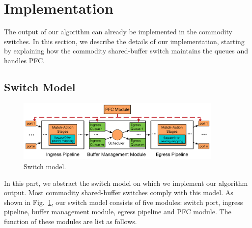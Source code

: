 \section{Implementation}\label{sec:implementation}

The output of our algorithm can already be implemented in the commodity switches. In this section, we
describe the details of our implementation, starting by explaining how the commodity shared-buffer switch
maintains the queues and handles PFC.   

\subsection{Switch Model}\label{subsec:model}

\begin{figure}
	\centering
		\includegraphics[width=0.9\textwidth] {figs/switch_model}
	\caption{Switch model.}\label{fig:switchmodel}

\end{figure}

In this part, we abstract the switch model on which we implement our algorithm output. 
Most commodity shared-buffer switches comply with this model. 
As shown in Fig.~\ref{fig:switchmodel}, our switch model consists of five modules: switch port, ingress pipeline, buffer management module, egress pipeline and PFC module. The function of these modules are list as follows.


